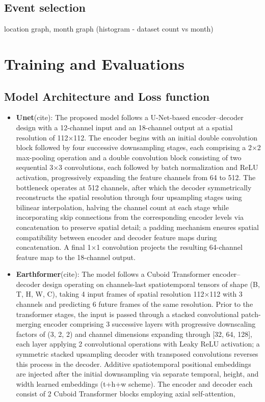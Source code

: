 \documentclass{article}
\begin{document}
\subsection{Event selection}
location graph, month graph (histogram - dataset count vs month)

\section{Training and Evaluations} 

\subsection{Model Architecture and Loss function}
\begin{itemize}
  \item \textbf{Unet}(cite): The proposed model follows a U-Net-based encoder–decoder design with a 12-channel input and an 18-channel output at a spatial resolution of 112×112. The encoder begins with an initial double convolution block followed by four successive downsampling stages, each comprising a 2×2 max-pooling operation and a double convolution block consisting of two sequential 3×3 convolutions, each followed by batch normalization and ReLU activation, 
  progressively expanding the feature channels from 64 to 512. The bottleneck operates at 512 channels, after which the decoder symmetrically reconstructs the spatial resolution through four upsampling stages using bilinear interpolation, halving the channel count at each stage while incorporating skip connections from the corresponding encoder levels via concatenation to preserve spatial detail; a padding mechanism ensures spatial compatibility between encoder and decoder 
  feature maps during concatenation. A final 1×1 convolution projects the resulting 64-channel feature map to the 18-channel output.
  \item \textbf{Earthformer}(cite): The model follows a Cuboid Transformer encoder–decoder design operating on channels-last spatiotemporal tensors of shape (B, T, H, W, C), taking 4 input frames of spatial resolution 112×112 with 3 channels and predicting 6 future frames of the same resolution. Prior to the transformer stages, the input is passed through a stacked convolutional patch-merging encoder comprising 3 successive layers with progressive downscaling factors
   of (3, 2, 2) and channel dimensions expanding through [32, 64, 128], each layer applying 2 convolutional operations with Leaky ReLU activation; a symmetric stacked upsampling decoder with transposed convolutions reverses this process in the decoder. Additive spatiotemporal positional embeddings are injected after the initial downsampling via separate temporal, height, and width learned embeddings (t+h+w scheme). The encoder and decoder each consist of 2 Cuboid Transformer blocks employing axial self-attention, 

\end{itemize}
\end{document}
